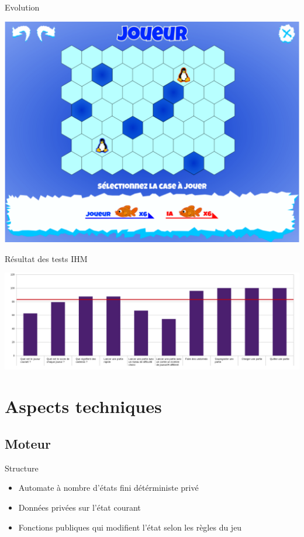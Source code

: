 \documentclass{beamer}
\begin{document}
\begin{frame}{Evolution}
    \begin{center}
      \includegraphics[scale=0.25]{ancienPlateau}
    \end{center}
\end{frame}

\begin{frame}{Résultat des tests IHM}
\begin{center}
 \includegraphics[scale=0.28]{graphIHM}
\end{center}
\end{frame}

\section{Aspects techniques}


\subsection{Moteur}

\begin{frame}{Structure}
\begin{block}{}
\begin{itemize}
\item<1-> Automate à nombre d'états fini détérministe privé
\item<2-> Données privées sur l'état courant
\item<3-> Fonctions publiques qui modifient l'état selon les règles du jeu
\end{itemize}
\end{block}
\end{frame}
\end{document}
